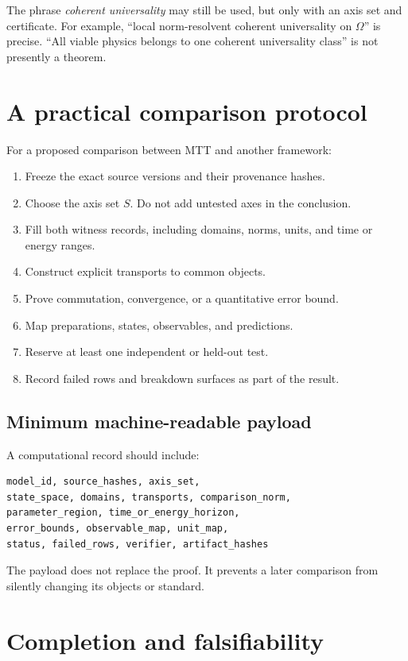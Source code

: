 \documentclass[11pt]{article}
\theoremstyle{definition}
\theoremstyle{remark}
\begin{document}
The phrase \emph{coherent universality} may still be used, but only with an axis
set and certificate. For example, ``local norm-resolvent coherent universality
on \(\Omega\)'' is precise. ``All viable physics belongs to one coherent
universality class'' is not presently a theorem.

\section{A practical comparison protocol}
\label{sec:protocol}

For a proposed comparison between MTT and another framework:
\begin{enumerate}[label=\textbf{Step \arabic*.},leftmargin=4.8em]
  \item Freeze the exact source versions and their provenance hashes.
  \item Choose the axis set \(S\). Do not add untested axes in the conclusion.
  \item Fill both witness records, including domains, norms, units, and time or
  energy ranges.
  \item Construct explicit transports to common objects.
  \item Prove commutation, convergence, or a quantitative error bound.
  \item Map preparations, states, observables, and predictions.
  \item Reserve at least one independent or held-out test.
  \item Record failed rows and breakdown surfaces as part of the result.
\end{enumerate}

\subsection{Minimum machine-readable payload}

A computational record should include:
\begin{verbatim}
model_id, source_hashes, axis_set,
state_space, domains, transports, comparison_norm,
parameter_region, time_or_energy_horizon,
error_bounds, observable_map, unit_map,
status, failed_rows, verifier, artifact_hashes
\end{verbatim}
The payload does not replace the proof. It prevents a later comparison from
silently changing its objects or standard.

\section{Completion and falsifiability}
\label{sec:falsifiability}
\end{document}
